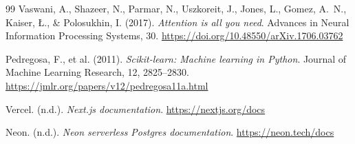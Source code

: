 \documentclass[12pt]{article}
\begin{document}
\begin{thebibliography}{99}
Vaswani, A., Shazeer, N., Parmar, N., Uszkoreit, J., Jones, L., Gomez, A.~N.,
Kaiser, \L., \& Polosukhin, I. (2017).
\textit{Attention is all you need}.
Advances in Neural Information Processing Systems, 30.
\url{https://doi.org/10.48550/arXiv.1706.03762}

Pedregosa, F., et al. (2011).
\textit{Scikit-learn: Machine learning in Python}.
Journal of Machine Learning Research, 12, 2825--2830.
\url{https://jmlr.org/papers/v12/pedregosa11a.html}

Vercel. (n.d.).
\textit{Next.js documentation}.
\url{https://nextjs.org/docs}

Neon. (n.d.).
\textit{Neon serverless Postgres documentation}.
\url{https://neon.tech/docs}

\end{thebibliography}
\end{document}
